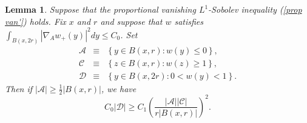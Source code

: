 \documentclass{amsart}
\theoremstyle{plain}
\newtheorem{lemma}[theorem]{Lemma}
\numberwithin{equation}{section}
\begin{document}
\begin{lemma}
	\label{DeG Lemma}Suppose that the proportional vanishing $L^{1}$-Sobolev
	inequality (\ref{prop van'}) holds. Fix $x$ and $r$ and suppose that $w$
	satisfies $\int_{B\left( x,2r\right) }\left\vert \nabla _{A}w_{+}\left(
	y\right) \right\vert ^{2}dy\leq C_{0}$. Set 
	\begin{eqnarray*}
		\mathcal{A} &\equiv &\left\{ y\in B\left( x,r\right) :w\left( y\right) \leq
		0\right\} , \\
		\mathcal{C} &\equiv &\left\{ z\in B\left( x,r\right) :w\left( z\right) \geq
		1\right\} , \\
		\mathcal{D} &\equiv &\left\{ y\in B\left( x,2r\right) :0<w\left( y\right)
		<1\right\} .
	\end{eqnarray*}%
	Then if $\left\vert \mathcal{A}\right\vert \geq \frac{1}{2}\left\vert
	B\left( x,r\right) \right\vert $, we have 
	\begin{equation}
	C_{0}\left\vert \mathcal{D}\right\vert \geq C_{1}\left( \frac{\left\vert 
		\mathcal{A}\right\vert \left\vert \mathcal{C}\right\vert }{r\left\vert
		B\left( x,r\right) \right\vert }\right) ^{2}.  \label{isoperimetric}
	\end{equation}
\end{lemma}
\end{document}
